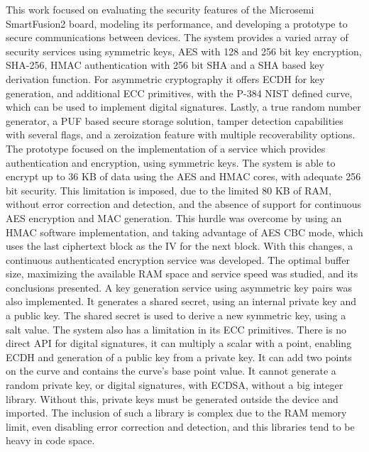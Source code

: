 \cleardoublepage
\label{chap:conclusion}

This work focused on evaluating the security features of the Microsemi SmartFusion2 board, modeling its performance, and developing a prototype to secure communications between devices.
The system provides a varied array of security services using symmetric keys, AES with 128 and 256 bit key encryption, SHA-256, HMAC authentication with 256 bit SHA and a SHA based key derivation function. For asymmetric cryptography it offers ECDH for key generation, and additional ECC primitives, with the P-384 NIST defined curve, which can be used to implement digital signatures. Lastly, a true random number generator, a PUF based secure storage solution, tamper detection capabilities with several flags, and a zeroization feature with multiple recoverability options.
The prototype focused on the implementation of a service which provides authentication and encryption, using symmetric keys. The system is able to encrypt up to 36 KB of data using the AES and HMAC cores, with adequate 256 bit security. This limitation is imposed, due to the limited 80 KB of RAM, without error correction and detection, and the absence of support for continuous AES encryption and MAC generation. This hurdle was overcome by using an HMAC software implementation, and taking advantage of AES CBC mode, which uses the last ciphertext block as the IV for the next block. With this changes, a continuous authenticated encryption service was developed. The optimal buffer size, maximizing the available RAM space and service speed was studied, and its conclusions presented.
A key generation service using asymmetric key pairs was also implemented. It generates a shared secret, using an internal private key and a public key. The shared secret is used to derive a new symmetric key, using a salt value.
The system also has a limitation in its ECC primitives. There is no direct API for digital signatures, it can multiply a scalar with a point, enabling ECDH and generation of a public key from a private key. It can add two points on the curve and contains the curve's base point value. It cannot generate a random private key, or digital signatures, with ECDSA, without a big integer library. Without this, private keys must be generated outside the device and imported. The inclusion of such a library is complex due to the RAM memory limit, even disabling error correction and detection, and this libraries tend to be heavy in code space. 
